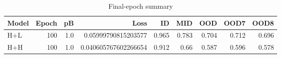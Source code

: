\begin{table}[t]
\centering
\begin{tabular}{lrrrrrrrr}
\hline
Model & Epoch & pB & Loss & ID & MID & OOD & OOD7 & OOD8 \\
\hline
H+L & 100 & 1.0 & 0.05999790815203577 & 0.965 & 0.783 & 0.704 & 0.712 & 0.696 \\
H+H & 100 & 1.0 & 0.040605767602266654 & 0.912 & 0.66 & 0.587 & 0.596 & 0.578 \\
\hline
\end{tabular}
\caption{Final-epoch summary}
\label{tab:final}
\end{table}
